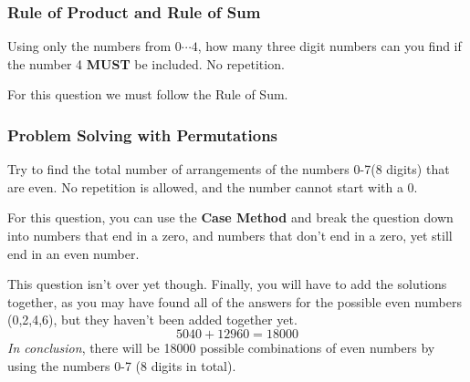         \subsubsection{Rule of Product and Rule of Sum}
            \begin{example}
                Using only the numbers from $0\cdots4$, how many three digit numbers can you find if the number 4 \textbf{MUST} be included. No repetition.
            \end{example}
            For this question we must follow the Rule of Sum.
            
    \clearpage
        \subsubsection{Problem Solving with Permutations}
            \begin{example}
                Try to find the total number of arrangements of the numbers 0-7(8 digits) that are even. No repetition is allowed, and the number cannot start with a 0.
            \end{example}
            For this question, you can use the \textbf{Case Method} and break the question down into numbers that end in a zero, and numbers that don't end in a zero, yet still end in an even number. 
            \begin{parcolumns}{2}
                \colplacechunks
            \end{parcolumns}
            This question isn't over yet though. Finally, you will have to add the solutions together, as you may have found all of the answers for the possible even numbers (0,2,4,6), but they haven't been added together yet.
            \begin{equation*}
                5040 + 12960 = 18000
            \end{equation*}
            \emph{In conclusion}, there will be 18000 possible combinations of even numbers by using the numbers 0-7 (8 digits in total).
            
